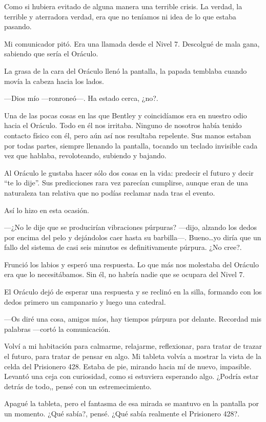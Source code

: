 Como si hubiera evitado de alguna manera una terrible crisis. La verdad,
la terrible y aterradora verdad, era que no teníamos ni idea de lo que
estaba pasando.

Mi comunicador pitó. Era una llamada desde el Nivel 7. Descolgué de mala
gana, sabiendo que sería el Oráculo.

La grasa de la cara del Oráculo llenó la pantalla, la papada temblaba
cuando movía la cabeza hacia los lados.

---Dios mío ---ronroneó---. Ha estado cerca, ¿no?.

Una de las pocas cosas en las que Bentley y coincidíamos era en nuestro
odio hacia el Oráculo. Todo en él nos irritaba. Ninguno de nosotros
había tenido contacto físico con él, pero aún así nos resultaba
repelente. Sus manos estaban por todas partes, siempre llenando la
pantalla, tocando un teclado invisible cada vez que hablaba,
revoloteando, subiendo y bajando.

Al Oráculo le gustaba hacer sólo dos cosas en la vida: predecir el
futuro y decir ``te lo dije''. Sus predicciones rara vez parecían
cumplirse, aunque eran de una naturaleza tan relativa que no podías
reclamar nada tras el evento.

Así lo hizo en esta ocasión.

---¿No le dije que se producirían vibraciones púrpuras? ---dijo, alzando
los dedos por encima del pelo y dejándolos caer hasta su barbilla---.
Bueno\ldots{}yo diría que un fallo del sistema de casi seis minutos es
definitivamente púrpura. ¿No cree?.

Frunció los labios y esperó una respuesta. Lo que más nos molestaba del
Oráculo era que lo necesitábamos. Sin él, no habría nadie que se ocupara
del Nivel 7.

El Oráculo dejó de esperar una respuesta y se reclinó en la silla,
formando con los dedos primero un campanario y luego una catedral.

---Os diré una cosa, amigos míos, hay tiempos púrpura por delante.
Recordad mis palabras ---cortó la comunicación.

Volví a mi habitación para calmarme, relajarme, reflexionar, para tratar
de trazar el futuro, para tratar de pensar en algo. Mi tableta volvía a
mostrar la vista de la celda del Prisionero 428. Estaba de pie, mirando
hacia mí de nuevo, impasible. Levantó una ceja con curiosidad, como si
estuviera esperando algo. ¿Podría estar detrás de todo,, pensé con un
estremecimiento.

Apagué la tableta, pero el fantasma de esa mirada se mantuvo en la
pantalla por un momento. ¿Qué sabía?, pensé. ¿Qué sabía realmente el
Prisionero 428?.